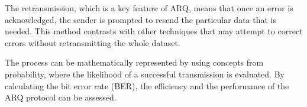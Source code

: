 The retransmission, which is a key feature of ARQ, means that once an error is acknowledged, the sender is prompted to resend the particular data that is needed. This method contrasts with other techniques that may attempt to correct errors without retransmitting the whole dataset.

The process can be mathematically represented by using concepts from probability, where the likelihood of a successful transmission is evaluated. By calculating the bit error rate (BER), the efficiency and the performance of the ARQ protocol can be assessed.

